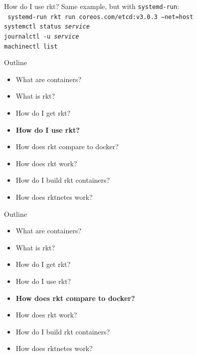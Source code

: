 \documentclass[pdf,aspectratio=169]{beamer}
\begin{document}
\begin{frame}{How do I use rkt?}
    Same example, but with \texttt{systemd-run}: \\
    \vspace{1em}
    \texttt{\noindent
        \pause
        systemd-run rkt run coreos.com/etcd:v3.0.3 --net=host \\
        \pause
        systemctl status \textit{service} \\
        \pause
        journalctl -u \textit{service} \\
        \pause
        machinectl list
    }
\end{frame}


\begin{frame}
    Outline
    \begin{itemize}
        \item What are containers?
        \item What is rkt?
        \item How do I get rkt?
        \item \textbf{How do I use rkt?}
        \item How does rkt compare to docker?
        \item How does rkt work?
        \item How do I build rkt containers?
        \item How does rktnetes work?
    \end{itemize}
\end{frame}

\begin{frame}
    Outline
    \begin{itemize}
        \item What are containers?
        \item What is rkt?
        \item How do I get rkt?
        \item How do I use rkt?
        \item \textbf{How does rkt compare to docker?}
        \item How does rkt work?
        \item How do I build rkt containers?
        \item How does rktnetes work?
    \end{itemize}
\end{frame}
\end{document}
